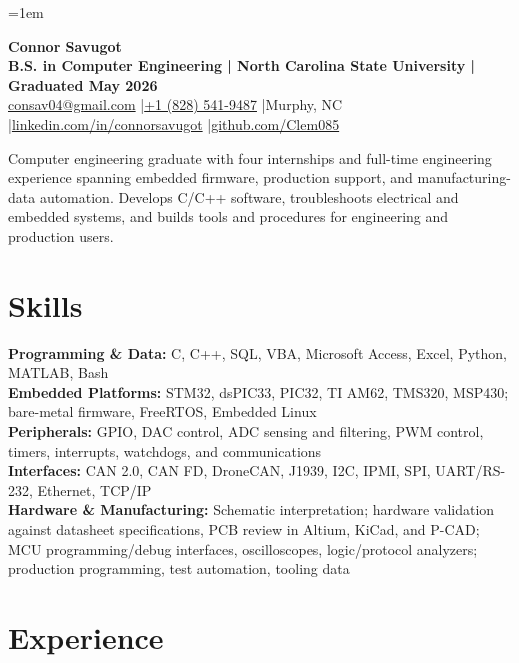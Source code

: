 \documentclass[10pt,letterpaper]{article}
\begin{document}
\fontsize{9.85}{10.85}\selectfont
\setlength{\RaggedRightRightskip}{0pt plus 5em}
\RaggedRight
\emergencystretch=1em

\begin{center}
  {\color{resumeBlue}\fontsize{24.5}{25.2}\selectfont\bfseries Connor Savugot}\\[2.5pt]
  {\bfseries B.S. in Computer Engineering | North Carolina State University | Graduated May 2026}\\[1.5pt]
  {\fontsize{9.6}{10.2}\selectfont
    \href{mailto:consav04@gmail.com}{consav04@gmail.com}
    \enspace|\enspace \href{tel:+18285419487}{+1 (828) 541-9487}
    \enspace|\enspace Murphy, NC
    \enspace|\enspace \href{https://linkedin.com/in/connorsavugot}{linkedin.com/in/connorsavugot}
    \enspace|\enspace \href{https://github.com/Clem085}{github.com/Clem085}}
\end{center}
\vspace{-0.18cm}

Computer engineering graduate with four internships and full-time engineering experience spanning embedded firmware, production support, and manufacturing-data automation. Develops C/C++ software, troubleshoots electrical and embedded systems, and builds tools and procedures for engineering and production users.

\section{Skills}
\textbf{Programming \& Data:} C, C++, SQL, VBA, Microsoft Access, Excel, Python, MATLAB, Bash\\
\textbf{Embedded Platforms:} STM32, dsPIC33, PIC32, TI AM62, TMS320, MSP430; bare-metal firmware, FreeRTOS, Embedded Linux\\
\textbf{Peripherals:} GPIO, DAC control, ADC sensing and filtering, PWM control, timers, interrupts, watchdogs, and communications\\
\textbf{Interfaces:} CAN 2.0, CAN FD, DroneCAN, J1939, I2C, IPMI, SPI, UART/RS-232, Ethernet, TCP/IP\\
\textbf{Hardware \& Manufacturing:} Schematic interpretation; hardware validation against datasheet specifications, PCB review in Altium, KiCad, and P-CAD; MCU programming/debug interfaces, oscilloscopes, logic/protocol analyzers; production programming, test automation, tooling data

\section{Experience}
\end{document}
